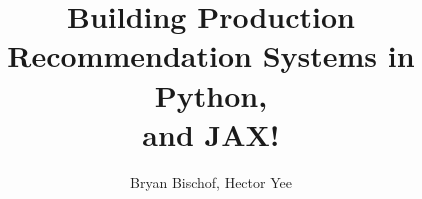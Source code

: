 \documentclass{book}
\begin{document}
\title{Building Production Recommendation Systems in Python,\\ and JAX!}
\author{Bryan Bischof, Hector Yee}








\end{document}
